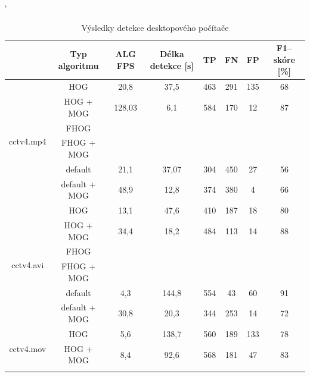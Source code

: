 \begin{table}[H]
\catcode`
\centering
\caption{Výsledky detekce desktopového počítače}
\label{resultTabDesktop}
\begin{tabular}{|c|c|c|c|c|c|c|c|}
\hline
                         & Typ algoritmu   	& ALG FPS & Délka detekce [s] & TP 	& FN & FP & F1--skóre [\%]\\ \hline
\multirow{6}{*}{cctv4.mp4} & HOG        	&  20,8   & 37,5       		  & 463 & 291   & 135   &  68        \\ \cline{2-8} 
                         & HOG + MOG  		& 128,03  &  6,1       		  & 584 & 170    & 12    & 87          \\ \cline{2-8} 
                         & FHOG       		&         &            		  &     &    &    &          \\ \cline{2-8} 
                         & FHOG + MOG 		&         &            		  &     &    &    &          \\ \cline{2-8}  
                         & default	 		&  21,1   & 37,07               & 304 & 450    & 27    & 56          \\ \cline{2-8} 
                         & default + MOG 	&  48,9   & 12,8                & 374 & 380    & 4    & 66          \\ \hline\hline 
\multirow{6}{*}{cctv4.avi} & HOG        	& 13,1    & 47,6           	  &  410& 187   & 18    & 80          \\ \cline{2-8} 
                         & HOG + MOG  		&   34,4  & 18,2          	  & 484 & 113    & 14    & 88          \\ \cline{2-8} 
                         & FHOG       		&         &               	  &    	&    &    &          \\ \cline{2-8} 
                         & FHOG + MOG 		&         &               	  &    	&    &    &          \\ \cline{2-8} 
                         & default  		& 4,3     & 144,8               & 554 & 43     & 60    & 91          \\ \cline{2-8} 
                         & default + MOG 	& 30,8    & 20,3                & 344 & 253    & 14    & 72          \\ \hline \hline
\multirow{6}{*}{cctv4.mov} & HOG        	& 5,6     & 138,7               &  560& 189    & 133    & 78          \\ \cline{2-8} 
                         & HOG + MOG  		& 8,4     & 92,6                & 568& 181    & 47    & 83          \\ \cline{2-8} 

\end{tabular}
\end{table}
